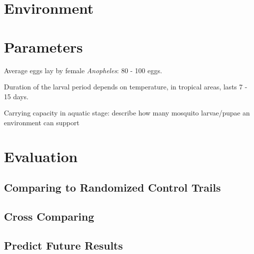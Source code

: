 \documentclass[a4paper, 12pt, twoside]{article}
\begin{document}
\section{Environment}
\section{Parameters}

Average eggs lay by female \textit{Anopheles}: 80 - 100 eggs.

Duration of the larval period depends on temperature, in tropical areas, lasts 7 - 15 days.\cite{bayoh_lindsay_2003}

Carrying capacity in aquatic stage: describe how many mosquito larvae/pupae an environment can support

\section{Evaluation}
\subsection{Comparing to Randomized Control Trails}
\subsection{Cross Comparing}
\subsection{Predict Future Results}

\appendix
\printglossaries
\printnomenclature


\end{document}
